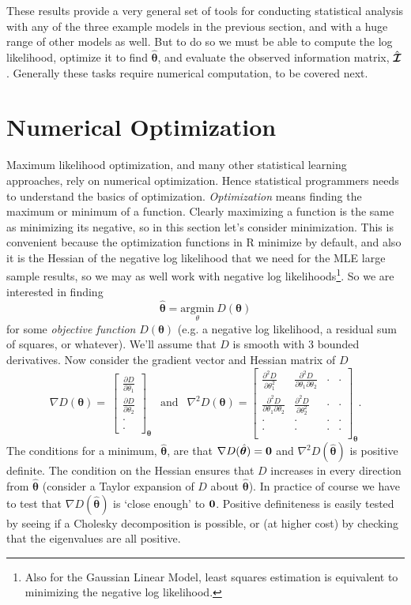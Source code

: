 \documentclass[10pt] {article}
\newcommand{\bmat}[1]{\left [ \begin{array}{#1}}
\newcommand{\emat}{\end{array}\right ]}
\newcommand{\pdif}[2]{\frac{\partial #1}{\partial #2}}
\newcommand{\pddif}[3]{\frac{\partial^2 #1}{\partial #2 \partial #3}}
\theoremstyle{definition}
\begin{document}
These results provide a very general set of tools for conducting statistical analysis with any of the three example models in the previous section, and with a huge range of other models as well. But to do so we must be able to compute the log likelihood, optimize it to find $\hat {\bm \theta}$, and evaluate the observed information matrix, $\hat{\bm{{\cal I}}}$. Generally these tasks require numerical computation, to be covered next.  

\section{Numerical Optimization}

Maximum likelihood optimization, and many other statistical learning approaches, rely on numerical optimization. Hence  statistical programmers needs to understand the basics of optimization. {\em Optimization} means finding the maximum or minimum of a function. Clearly maximizing a function is the same as minimizing its negative, so in this section let's consider minimization. This is convenient because the optimization functions in R minimize by default, and also it is the Hessian of the negative log likelihood that we need for the MLE large sample results, so we may as well work with negative log likelihoods\footnote{Also for the Gaussian Linear Model, least squares estimation is equivalent to minimizing the negative log likelihood.}. So we are interested in finding 
$$
\hat {\bm \theta} = \underset{\theta}{\text{argmin}} ~ D({\bm \theta})
$$
for some {\em objective function} $D({\bm \theta})$ (e.g. a negative log likelihood, a residual sum of squares, or whatever). We'll assume that $D$ is smooth with 3 bounded derivatives. Now consider the gradient vector and Hessian matrix of $D$
$$
\nabla D({\bm \theta}) = \ \bmat{c} \pdif{D}{\theta_1}\\ \pdif{D}{\theta_2}\\ \cdot \\ \cdot \emat_{ {\bm \theta}} ~~ \text{  and } ~~
\nabla^2 D({\bm \theta}) = \bmat{cccc}  
\pdif{^2D}{\theta_1^2} & \pddif{D}{\theta_1}{\theta_2} & \cdot & \cdot \\
\pddif{D}{\theta_1}{\theta_2} & \pdif{^2D}{\theta_2^2} & \cdot & \cdot \\
\cdot & \cdot& \cdot & \cdot \\\cdot & \cdot& \cdot & \cdot \\
\emat_{ {\bm \theta}}.
$$
The conditions for a minimum, $\hat {\bm \theta}$, are that $\nabla D(\hat {\bm \theta}) = {\bf 0}$ and $\nabla^2 D(\hat {\bm \theta})$ is positive definite. The condition on the Hessian ensures that $D$ increases in every direction from $\hat {\bm \theta}$ (consider a Taylor expansion of $D$ about $\hat {\bm \theta}$). In practice of course we have to test that  $\nabla D(\hat {\bm \theta})$ is `close enough' to ${\bf 0}$. Positive definiteness is easily tested by seeing if a Cholesky decomposition is possible, or (at higher cost) by checking that the eigenvalues are all positive.
\end{document}
